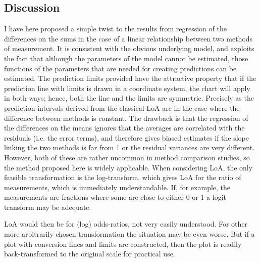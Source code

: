 \subsection{Discussion}
I have here proposed a simple twist to the results from regression of the differences on the sums in the case of a linear relationship
between two methods of measurement. It is consistent with the obvious underlying model, and exploits the fact that although
the parameters of the model cannot be estimated, those functions of the parameters that are needed for creating predictions
can be estimated.
The prediction limits provided have the attractive property that if the prediction line with limits is drawn in a coordinate
system, the chart will apply in both ways; hence, both the line and the limits are symmetric. Precisely as the prediction intervals
derived from the classical LoA are in the case where the difference between methods is constant.
The drawback is that the regression of the differences on the means ignores that the averages are correlated with the residuals
(i.e. the error terms), and therefore gives biased estimates if the slope linking the two methods is far from 1 or the residual
variances are very different. However, both of these are rather uncommon in method comparison studies, so the method proposed
here is widely applicable.
When considering LoA, the only feasible transformation is the log-transform, which gives LoA for the ratio of measurements,
which is immediately understandable. If, for example, the measurements are fractions where some are close to either 0 or 1 a
logit transform may be adequate. 

LoA would then be for (log) odds-ratios, not very easily understood. For other more arbitrarily
chosen transformation the situation may be even worse. But if a plot with conversion lines and limits are constructed, then the
plot is readily back-transformed to the original scale for practical use.


